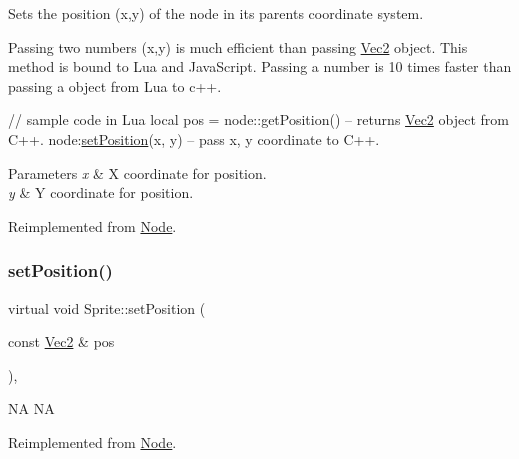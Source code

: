 Sets the position (x,y) of the node in its parent\textquotesingle{}s coordinate system.

Passing two numbers (x,y) is much efficient than passing \hyperlink{classVec2}{Vec2} object. This method is bound to Lua and Java\+Script. Passing a number is 10 times faster than passing a object from Lua to c++.


\begin{DoxyCode}
\textcolor{comment}{// sample code in Lua}
local pos  = node::getPosition()  -- returns \hyperlink{classVec2}{Vec2} \textcolor{keywordtype}{object} from C++.
node:\hyperlink{classSprite_aace7c480af3721709b218bdc579f8903}{setPosition}(x, y)            -- pass x, y coordinate to C++.
\end{DoxyCode}



\begin{DoxyParams}{Parameters}
{\em x} & X coordinate for position. \\
\hline
{\em y} & Y coordinate for position. \\
\hline
\end{DoxyParams}


Reimplemented from \hyperlink{classNode_aaa8545c103ef1b35e5076dbedab93af5}{Node}.

\mbox{\label{classSprite_a0c950da6338ba62938d7b2af6eea8b39}} 
\subsubsection{\texorpdfstring{set\+Position()}{setPosition()}\hspace{0.1cm}{\footnotesize\ttfamily [3/4]}}
{\footnotesize\ttfamily virtual void Sprite\+::set\+Position (\begin{DoxyParamCaption}\item[{const \hyperlink{classVec2}{Vec2} \&}]{pos }\end{DoxyParamCaption})\hspace{0.3cm}{\ttfamily [override]}, {\ttfamily [virtual]}}

NA  NA 

Reimplemented from \hyperlink{classNode_a8ffbf25763ef5f15eeae7227779505bc}{Node}.

\mbox{\label{classSprite_aaef708324799384499b67c1721ad36d1}} 
